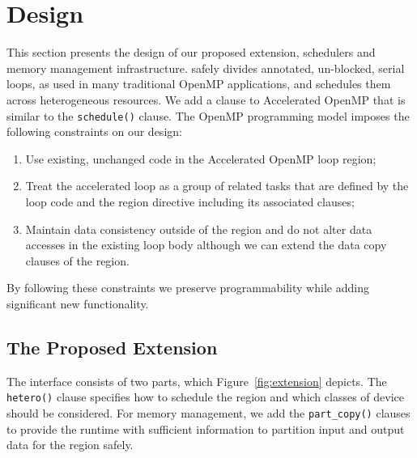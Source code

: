 \section{Design}
\label{sec:design}

This section presents the design of our proposed extension, schedulers and
memory management infrastructure. \tsar safely divides annotated,
un-blocked, serial loops, as used in many traditional OpenMP applications,
and schedules them across heterogeneous resources. We add a clause to
Accelerated OpenMP that is similar to the \verb#schedule()# clause. The
OpenMP programming model imposes the following constraints on our design:

\begin{enumerate}

  \item Use existing, unchanged code in the Accelerated OpenMP loop region;

  \item Treat the accelerated loop as a group of related tasks that are
    defined by the loop code and the region directive including its
    associated clauses;

  \item Maintain data consistency outside of the region and do not
    alter data accesses in the existing loop body although we can
    extend the data copy clauses of the region.

\end{enumerate}

\noindent By following these constraints we preserve programmability while
adding significant new functionality.


\subsection{The Proposed Extension}

The \tsar interface consists of two parts, which Figure~\ref{fig:extension}
depicts. The \verb#hetero()# clause specifies how to schedule the region
and which classes of device should be considered. For memory management, we
add the \verb#part_copy()# clauses to provide the runtime with sufficient
information to partition input and output data for the region safely.

